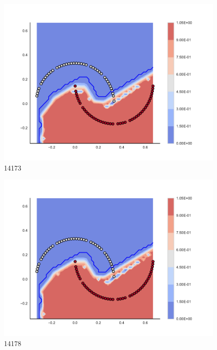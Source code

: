 \begin{subfigure}[b]{0.09\textwidth}
    \includegraphics[clip, trim=2.35cm 1.75cm 4.5cm 0cm,width=\textwidth]{img/convergence/14173.pdf}
    \caption{14173}
    \label{fig:convergence_14173}
\end{subfigure}
%
\begin{subfigure}[b]{0.09\textwidth}
    \includegraphics[clip, trim=2.35cm 1.75cm 4.5cm 0cm,width=\textwidth]{img/convergence/14178.pdf}
    \caption{14178}
    \label{fig:convergence_14178}
\end{subfigure}
%
